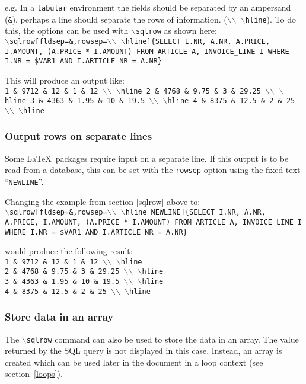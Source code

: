 \documentclass{article}
\newcommand{\bs}{\ensuremath{\backslash}}
\newcommand{\vs}{\vspace{3mm}}
\begin{document}
e.g. In a \texttt{tabular} environment the fields should be separated by an ampersand (\texttt{\&}),
perhaps a line should separate the rows of information. (\texttt{\bs\bs~\bs hline}).
To do this, the options can be used with \texttt{\bs sqlrow} as shown here: \\
\texttt{\bs sqlrow[fldsep=\&,rowsep=\bs\bs~\bs hline]\{SELECT I.NR, A.NR, 
A.PRICE, I.AMOUNT, (A.PRICE * I.AMOUNT) FROM ARTICLE A, INVOICE\_LINE I WHERE I.NR = \$VAR1 
AND I.ARTICLE\_NR = A.NR\}}

\vs

This will produce an output like: \\
\texttt{1 \& 9712 \& 12 \& 1 \& 12 \bs\bs~\bs hline 
2 \& 4768 \& 9.75 \& 3 \& 29.25 \bs\bs~\bs hline 
3 \& 4363 \& 1.95 \& 10 \& 19.5 \bs\bs~\bs hline 
4 \& 8375 \& 12.5 \& 2 \& 25 \bs\bs~\bs hline}

\subsubsection{Output rows on separate lines}

Some \LaTeX\ packages require input on a separate line. If this output is to be
read from a database, this can be set with the \texttt{rowsep} option using the
fixed text ``\texttt{NEWLINE}''.

Changing the example from section \ref{sqlrow} above to:\\
\texttt{\bs sqlrow[fldsep=\&,rowsep=\bs\bs~\bs hline NEWLINE]\{SELECT I.NR, A.NR, 
A.PRICE, I.AMOUNT, (A.PRICE * I.AMOUNT) FROM ARTICLE A, INVOICE\_LINE I WHERE I.NR = \$VAR1 
AND I.ARTICLE\_NR = A.NR\}}

\vs

would produce the following result: \\
\texttt{1 \& 9712 \& 12 \& 1 \& 12 \bs\bs~\bs hline \\
2 \& 4768 \& 9.75 \& 3 \& 29.25 \bs\bs~\bs hline \\
3 \& 4363 \& 1.95 \& 10 \& 19.5 \bs\bs~\bs hline \\
4 \& 8375 \& 12.5 \& 2 \& 25 \bs\bs~\bs hline}



\subsubsection{Store data in an array}


The \texttt{\bs sqlrow} command can also be used to store the data in an array. The value returned by the SQL query is not displayed in this case. Instead, an array is created which can be used later in the document in a loop context (see section~\ref{loops}).
\end{document}
